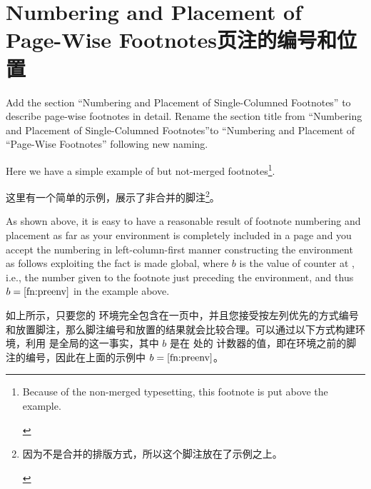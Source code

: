 \section{Numbering and Placement of Page-Wise Footnotes\hfill 页注的编号和位置}
\label{sec:fnnp}
{Add the section ``Numbering and Placement of Single-Columned
Footnotes'' to describe page-wise footnotes in detail.}
{Rename the section title from ``Numbering and Placement of
Single-Columned Footnotes''to ``Numbering and Placement of
``Page-Wise Footnotes'' following new naming.}

Here we have a simple example of \scfnote{} but not-merged
footnotes\footnote{
Because of the non-merged typesetting, this footnote is put above the
example.\par\Hrule\label{fn:preenv}}.

这里有一个简单的示例，展示了非合并的\scfnote{}脚注\footnote{因为不是合并的排版方式，所以这个脚注放在了示例之上。\par\Hrule\label{fn:preenv}}。

\begin{paracol}{2}
\switchcolumn
{}
\end{paracol}
\Hrule

As shown above, it is easy to have a reasonable result of footnote
numbering and placement as far as your  environment is
completely included in a page and you accept the numbering in
left-column-first manner constructing the environment as follows
exploiting the fact  is made global, where $b$ is the
value of  counter at \beginparacol, i.e., the number
given to the footnote just preceding the environment, and thus
$b=\ref{fn:preenv}$ in the example above.

如上所示，只要您的  环境完全包含在一页中，并且您接受按左列优先的方式编号和放置脚注，那么脚注编号和放置的结果就会比较合理。可以通过以下方式构建环境，利用  是全局的这一事实，其中 $b$ 是在 \beginparacol 处的  计数器的值，即在环境之前的脚注的编号，因此在上面的示例中 $b=\ref{fn:preenv}$。

